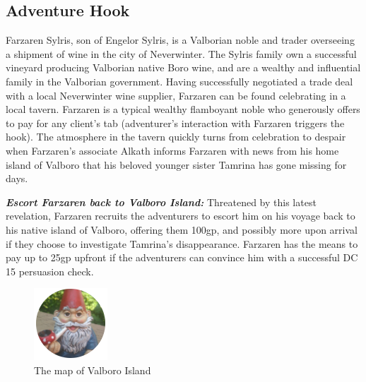 \begin{multicols*}{2}
	\subsection*{Adventure Hook}
	Farzaren Sylris, son of Engelor Sylris, is a Valborian noble and trader overseeing a shipment of wine in the city of Neverwinter. The Sylris family own a successful vineyard producing Valborian native Boro wine, and are a wealthy and influential family in the Valborian government. Having successfully negotiated a trade deal with a local Neverwinter wine supplier, Farzaren can be found celebrating in a local tavern. Farzaren is a typical wealthy flamboyant noble who generously offers to pay for any client’s tab (adventurer’s interaction with Farzaren triggers the hook). The atmosphere in the tavern quickly turns from celebration to despair when Farzaren’s associate Alkath informs Farzaren with news from his home island of Valboro that his beloved younger sister Tamrina has gone missing for days. 
	
	\textbf{\textit{Escort Farzaren back to Valboro Island:}} Threatened by this latest revelation, Farzaren recruits the adventurers to escort him on his voyage back to his native island of Valboro, offering them 100gp, and possibly more upon arrival if they choose to investigate Tamrina’s disappearance. Farzaren has the means to pay up to 25gp upfront if the adventurers can convince him with a successful DC 15 persuasion check.
	
	\begin{figure}
		\includegraphics[width=\textwidth]{images/placeholder}
		\caption{The map of Valboro Island}
	\end{figure}
	
\end{multicols*}
\pagebreak